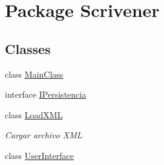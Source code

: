 \hypertarget{namespace_scrivener}{\section{Package Scrivener}
\label{namespace_scrivener}
}
\subsection*{Classes}
\begin{DoxyCompactItemize}
\item 
class \hyperlink{class_scrivener_1_1_main_class}{Main\-Class}
\item 
interface \hyperlink{interface_scrivener_1_1_i_persistencia}{I\-Persistencia}
\item 
class \hyperlink{class_scrivener_1_1_load_x_m_l}{Load\-X\-M\-L}
\begin{DoxyCompactList}\small\item\em Cargar archivo X\-M\-L \end{DoxyCompactList}\item 
class \hyperlink{class_scrivener_1_1_user_interface}{User\-Interface}
\end{DoxyCompactItemize}
